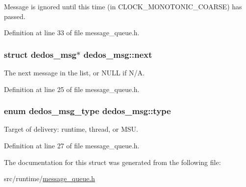 Message is ignored until this time (in C\-L\-O\-C\-K\-\_\-\-M\-O\-N\-O\-T\-O\-N\-I\-C\-\_\-\-C\-O\-A\-R\-S\-E) has passed. 



Definition at line 33 of file message\-\_\-queue.\-h.

\hypertarget{structdedos__msg_ab769ff04df992859169a7a456256bd04}{
\subsubsection[{next}]{\setlength{\rightskip}{0pt plus 5cm}struct {\bf dedos\-\_\-msg}$\ast$ dedos\-\_\-msg\-::next}}\label{structdedos__msg_ab769ff04df992859169a7a456256bd04}


The next message in the list, or N\-U\-L\-L if N/\-A. 



Definition at line 25 of file message\-\_\-queue.\-h.

\hypertarget{structdedos__msg_af4d233fc84b050bee1af851fd420d317}{
\subsubsection[{type}]{\setlength{\rightskip}{0pt plus 5cm}enum {\bf dedos\-\_\-msg\-\_\-type} dedos\-\_\-msg\-::type}}\label{structdedos__msg_af4d233fc84b050bee1af851fd420d317}


Target of delivery\-: runtime, thread, or M\-S\-U. 



Definition at line 27 of file message\-\_\-queue.\-h.



The documentation for this struct was generated from the following file\-:\begin{DoxyCompactItemize}
\item 
src/runtime/\hyperlink{message__queue_8h}{message\-\_\-queue.\-h}\end{DoxyCompactItemize}
